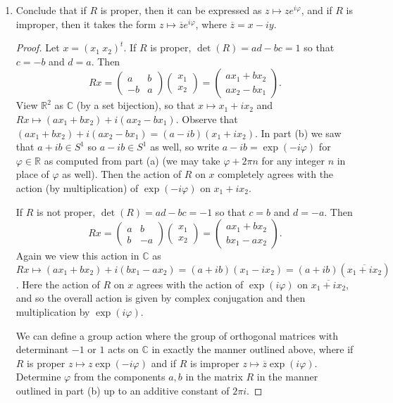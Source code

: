 \documentclass[11pt]{article}
\begin{document}
\begin{enumerate}[label=(\alph*)]
\begin{proof}
  Thus there exists $\varphi\in\mathbb{R}$ such that $a+ib = \exp(i\varphi)$.
  \end{proof}
  \item Conclude that if $R$ is proper, then it can be expressed as $z\mapsto ze^{i\varphi}$, and if $R$ is improper, then it takes the form $z\mapsto \overline{z}e^{i\varphi}$, where $\overline{z} = x-iy$.
  \begin{proof} Let $x = (x_1 ~ x_2)^t$.
    If $R$ is proper, $\det(R) = ad-bc = 1$ so that $c=-b$ and $d=a$. Then \[Rx = \begin{pmatrix}
      a & b \\ -b & a
    \end{pmatrix}\begin{pmatrix}
      x_1\\x_2
    \end{pmatrix} = \begin{pmatrix}
      ax_1+bx_2\\ax_2-bx_1
    \end{pmatrix}.\] View $\mathbb{R}^2$ as $\mathbb{C}$ (by a set bijection), so that $x \mapsto x_1+ix_2$ and $Rx \mapsto (ax_1+bx_2) + i(ax_2-bx_1)$. Observe that $(ax_1+bx_2) + i(ax_2-bx_1) = (a-ib)(x_1+ix_2)$. In part (b) we saw that $a+ib\in S^1$ so $a-ib\in S^1$ as well, so write $a-ib = \exp(-i\varphi)$ for $\varphi\in \mathbb{R}$ as computed from part (a) (we may take $\varphi + 2\pi n$ for any integer $n$ in place of $\varphi$ as well). Then the action of $R$ on $x$ completely agrees with the action (by multiplication) of $\exp(-i\varphi)$ on $x_1+ix_2$.

    If $R$ is not proper, $\det(R) = ad-bc = -1$ so that $c=b$ and $d=-a$. Then \[Rx = \begin{pmatrix}
      a & b \\ b & -a
    \end{pmatrix}\begin{pmatrix}
      x_1\\x_2
    \end{pmatrix} = \begin{pmatrix}
      ax_1+bx_2\\bx_1-ax_2
    \end{pmatrix}.\] Again we view this action in $\mathbb{C}$ as $Rx \mapsto (ax_1+bx_2) + i(bx_1-ax_2) = (a+ib)(x_1-ix_2) = (a+ib)(\overline{x_1+ix_2})$. Here the action of $R$ on $x$ agrees with the action of $\exp(i\varphi)$ on $\overline{x_1+ix_2}$, and so the overall action is given by complex conjugation and then multiplication by $\exp(i\varphi)$.
    
    We can define a group action where the group of orthogonal matrices with determinant $-1$ or $1$ acts on $\mathbb{C}$ in exactly the manner outlined above, where if $R$ is proper $z\mapsto z\exp(-i\varphi)$ and if $R$ is improper $z\mapsto \overline{z}\exp(i\varphi)$. Determine $\varphi$ from the components $a,b$ in the matrix $R$ in the manner outlined in part (b) up to an additive constant of $2\pi i$.
  \end{proof}
\end{enumerate}
\end{document}
